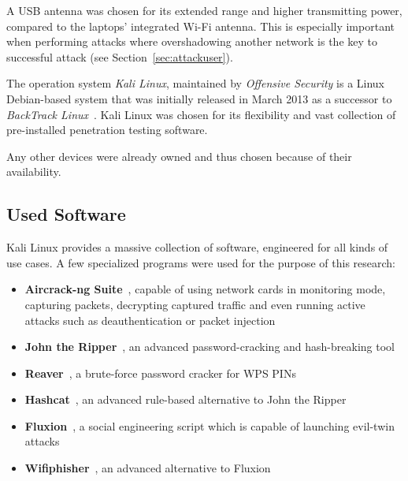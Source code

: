 A USB antenna was chosen for its extended range and higher transmitting power, compared to the laptops' integrated Wi-Fi antenna. This is especially important when performing attacks where overshadowing another network is the key to successful attack (see Section~\ref{sec:attackuser}).

The operation system \emph{Kali Linux}, maintained by \emph{Offensive Security} is a Linux Debian-based system that was initially released in March 2013 as a successor to \emph{BackTrack Linux}~\cite{OffSecDoc17}. Kali Linux was chosen for its flexibility and vast collection of pre-installed penetration testing software.

Any other devices were already owned and thus chosen because of their availability.

\subsection{Used Software}

Kali Linux provides a massive collection of software, engineered for all kinds of use cases. A few specialized programs were used for the purpose of this research:

\begin{itemize}

\item{\textbf{Aircrack-ng Suite}~\cite{AirNg17}, capable of using network cards in monitoring mode, capturing packets, decrypting captured traffic and even running active attacks such as deauthentication or packet injection}

\item{\textbf{John the Ripper}~\cite{Openwall17}, an advanced password-cracking and hash-breaking tool}

\item{\textbf{Reaver}~\cite{Reaver17}, a brute-force password cracker for WPS PINs}

\item{\textbf{Hashcat}~\cite{Steube17}, an advanced rule-based alternative to John the Ripper}

\item{\textbf{Fluxion}~\cite{Fluxion17}, a social engineering script which is capable of launching evil-twin attacks}

\item{\textbf{Wifiphisher}~\cite{Wifiphisher17}, an advanced alternative to Fluxion}

\end{itemize}

